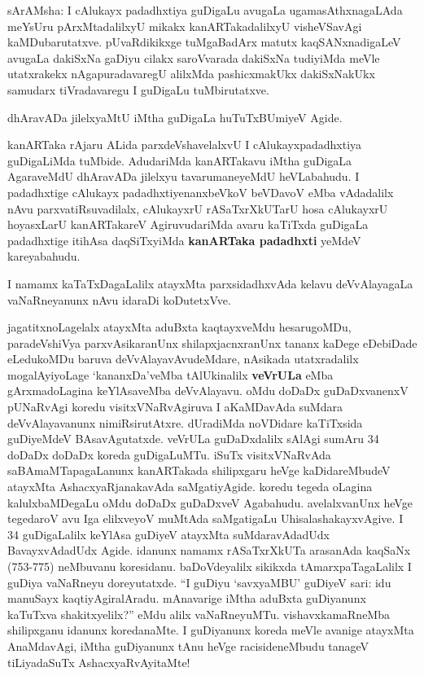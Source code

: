\documentclass[11pt,a4size]{article}
\begin{document}
sArAMsha: I cAlukayx padadhxtiya guDigaLu avugaLa ugamasAthxnagaLAda
meYsUru pArxMtadalilxyU mikakx kanARTakadalilxyU visheVSavAgi
kaMDubarutatxve. pUvaRdikikxge tuMgaBadArx matutx kaqSANxnadigaLeV
avugaLa dakiSxNa gaDiyu cilakx saroVvarada dakiSxNa tudiyiMda meVle
utatxrakekx nAgapuradavaregU alilxMda pashicxmakUkx dakiSxNakUkx
samudarx tiVradavaregu I guDigaLu tuMbirutatxve.

dhAravADa jilelxyaMtU iMtha guDigaLa huTuTxBUmiyeV Agide.

kanARTaka rAjaru ALida parxdeVshavelalxvU I cAlukayxpadadhxtiya
guDigaLiMda tuMbide. AdudariMda kanARTakavu iMtha guDigaLa AgaraveMdU
dhAravADa jilelxyu tavarumaneyeMdU heVLabahudu. I padadhxtige cAlukayx
padadhxtiyenanxbeVkoV beVDavoV eMba vAdadalilx nAvu
parxvatiRsuvadilalx, cAlukayxrU rASaTxrXkUTarU hosa cAlukayxrU
hoyasxLarU kanARTakareV AgiruvudariMda avaru kaTiTxda guDigaLa
padadhxtige itihAsa daqSiTxyiMda \textbf{kanARTaka padadhxti} yeMdeV
kareyabahudu.

I namamx kaTaTxDagaLalilx atayxMta parxsidadhxvAda kelavu
deVvAlayagaLa vaNaRneyanunx nAvu idaraDi koDutetxVve.

jagatitxnoLagelalx atayxMta aduBxta kaqtayxveMdu hesarugoMDu,
paradeVshiVya parxvAsikaranUnx shilapxjacnxranUnx tananx kaDege
eDebiDade eLedukoMDu baruva deVvAlayavAvudeMdare, nAsikada
utatxradalilx mogalAyiyoLage `kananxDa'veMba tAlUkinalilx
\textbf{veVrULa} eMba gArxmadoLagina keYlAsaveMba deVvAlayavu. oMdu
doDaDx guDaDxvanenxV pUNaRvAgi koredu visitxVNaRvAgiruva I aKaMDavAda
suMdara deVvAlayavanunx nimiRsirutAtxre. dUradiMda noVDidare
kaTiTxsida guDiyeMdeV BAsavAgutatxde. veVrULa guDaDxdalilx sAlAgi
sumAru 34 doDaDx doDaDx koreda guDigaLuMTu. iSuTx visitxVNaRvAda
saBAmaMTapagaLanunx kanARTakada shilipxgaru heVge kaDidareMbudeV
atayxMta AshacxyaRjanakavAda saMgatiyAgide. koredu tegeda oLagina
kalulxbaMDegaLu oMdu doDaDx guDaDxveV Agabahudu. avelalxvanUnx heVge
tegedaroV avu Iga elilxveyoV muMtAda saMgatigaLu
UhisalashakayxvAgive. I 34 guDigaLalilx keYlAsa guDiyeV atayxMta
suMdaravAdadUdx BavayxvAdadUdx Agide. idanunx namamx rASaTxrXkUTa
arasanAda kaqSaNx (753-775) neMbuvanu koresidanu. baDoVdeyalilx
sikikxda tAmarxpaTagaLalilx I guDiya vaNaRneyu doreyutatxde. ``I
guDiyu `savxyaMBU' guDiyeV sari: idu manuSayx
kaqtiyAgiralAradu. mAnavarige iMtha aduBxta guDiyanunx kaTuTxva
shakitxyelilx?'' eMdu alilx vaNaRneyuMTu. vishavxkamaRneMba
shilipxganu idanunx koredanaMte. I guDiyanunx koreda meVle avanige
atayxMta AnaMdavAgi, iMtha guDiyanunx tAnu heVge racisideneMbudu
tanageV tiLiyadaSuTx AshacxyaRvAyitaMte!
\end{document}
